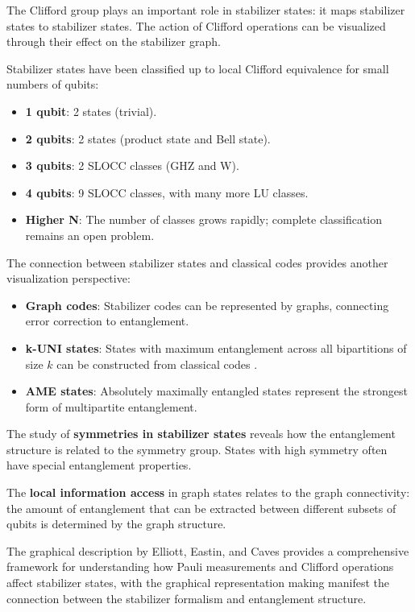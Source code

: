 \documentclass[12pt,a4paper]{article}
\begin{document}
The Clifford group plays an important role in stabilizer states: it maps stabilizer states to stabilizer states. The action of Clifford operations can be visualized through their effect on the stabilizer graph.

Stabilizer states have been classified up to local Clifford equivalence for small numbers of qubits:
\begin{itemize}
	\item \textbf{1 qubit}: 2 states (trivial).
	\item \textbf{2 qubits}: 2 states (product state and Bell state).
	\item \textbf{3 qubits}: 2 SLOCC classes (GHZ and W).
	\item \textbf{4 qubits}: 9 SLOCC classes, with many more LU classes.
	\item \textbf{Higher N}: The number of classes grows rapidly; complete classification remains an open problem.
\end{itemize}

The connection between stabilizer states and classical codes provides another visualization perspective:
\begin{itemize}
	\item \textbf{Graph codes}: Stabilizer codes can be represented by graphs, connecting error correction to entanglement.
	\item \textbf{k-UNI states}: States with maximum entanglement across all bipartitions of size $k$ can be constructed from classical codes \cite{Raissi2021}.
	\item \textbf{AME states}: Absolutely maximally entangled states represent the strongest form of multipartite entanglement.
\end{itemize}

The study of \textbf{symmetries in stabilizer states} \cite{Englbrecht2020} reveals how the entanglement structure is related to the symmetry group. States with high symmetry often have special entanglement properties.

The \textbf{local information access} in graph states relates to the graph connectivity: the amount of entanglement that can be extracted between different subsets of qubits is determined by the graph structure.

The graphical description by Elliott, Eastin, and Caves provides a comprehensive framework for understanding how Pauli measurements and Clifford operations affect stabilizer states, with the graphical representation making manifest the connection between the stabilizer formalism and entanglement structure.
\end{document}
